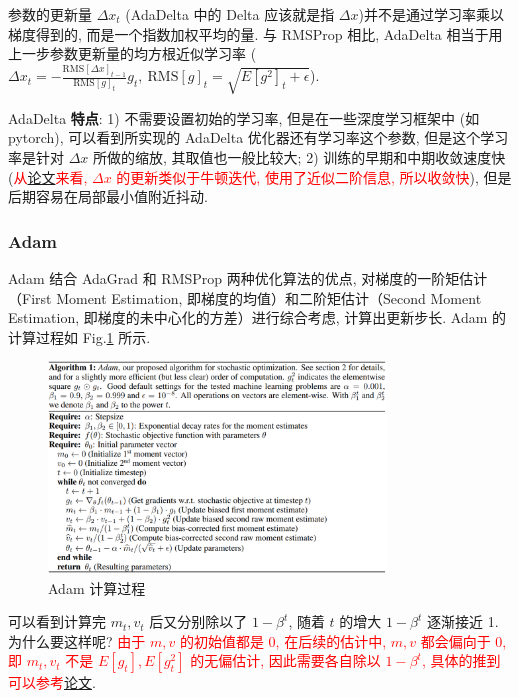 参数的更新量 $\Delta x_t$ (AdaDelta 中的 Delta 应该就是指 $\Delta x$)并不是通过学习率乘以梯度得到的, 而是一个指数加权平均的量. 与 RMSProp 相比, AdaDelta 相当于用上一步参数更新量的均方根近似学习率 ($\Delta x_t = -\frac{\text{RMS}[\Delta x]_{t-1}}{\text{RMS}[g]_t} g_t,\  \text{RMS}[g]_t = \sqrt{E[g^2]_t + \epsilon}$). 

AdaDelta \textbf{特点}: 1) 不需要设置初始的学习率, 但是在一些深度学习框架中 (如 pytorch), 可以看到所实现的 AdaDelta 优化器还有学习率这个参数, 但是这个学习率是针对 $\Delta x$ 所做的缩放, 其取值也一般比较大; 2) 训练的早期和中期收敛速度快 (\textcolor{red}{从\href{https://arxiv.org/pdf/1212.5701.pdf}{论文}来看, $\Delta x$ 的更新类似于牛顿迭代, 使用了近似二阶信息, 所以收敛快}), 但是后期容易在局部最小值附近抖动.

\subsubsection{Adam}
Adam\cite{kingma2015adam} 结合 AdaGrad 和 RMSProp 两种优化算法的优点, 对梯度的一阶矩估计（First Moment  Estimation, 即梯度的均值）和二阶矩估计（Second Moment Estimation, 即梯度的未中心化的方差）进行综合考虑, 计算出更新步长. Adam 的计算过程如 Fig.\ref{fig:adam} 所示. 

\begin{figure}[h]
	\centering
	\includegraphics[width=0.8\textwidth]{pics/adam.png}
	\caption{Adam 计算过程}
	\label{fig:adam}
\end{figure}

可以看到计算完 $m_t, v_t$ 后又分别除以了 $1-\beta^t$, 随着 $t$ 的增大 $1 - \beta^t$ 逐渐接近 1. 为什么要这样呢? \textcolor{red}{由于 $m, v$ 的初始值都是 0, 在后续的估计中, $m, v$ 都会偏向于 0, 即 $m_t, v_t$ 不是 $E[g_t], E[g_t^2]$ 的无偏估计, 因此需要各自除以 $1 - \beta^t$, 具体的推到可以参考\href{https://arxiv.org/pdf/1412.6980.pdf}{论文}}.

